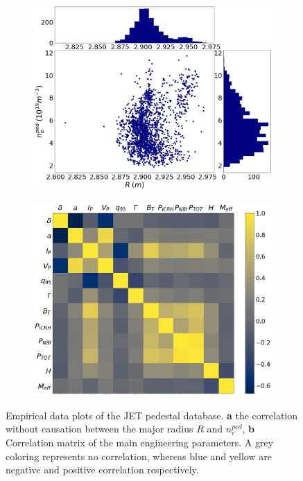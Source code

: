 \documentclass[a4paper, twoside, final, 12pt]{article}
\begin{document}
\begin{figure}[h]
        \centering
        \begin{subfigure}{0.5\linewidth}
                \centering
                \includegraphics[scale=0.2]{./src/R_vs_NEPED_matplotlib}
                \caption{}
                \label{subfig:icecream}
        \end{subfigure} \hfill
        \begin{subfigure}{0.45\linewidth}
                \centering
                \includegraphics[scale=0.2]{./src/input_correlations}
                \caption{}
                \label{subfig:corr}
        \end{subfigure}
	\caption{Empirical data plots of the JET pedestal database. \textbf{a} the correlation without causation between the major radius $R$ and $n_e^{ped}$,  \textbf{b}  Correlation matrix of the main engineering parameters. A grey coloring represents no correlation, whereas blue and yellow are negative and positive correlation respectively.}
	\label{fig:emperical}
\end{figure}
\end{document}
